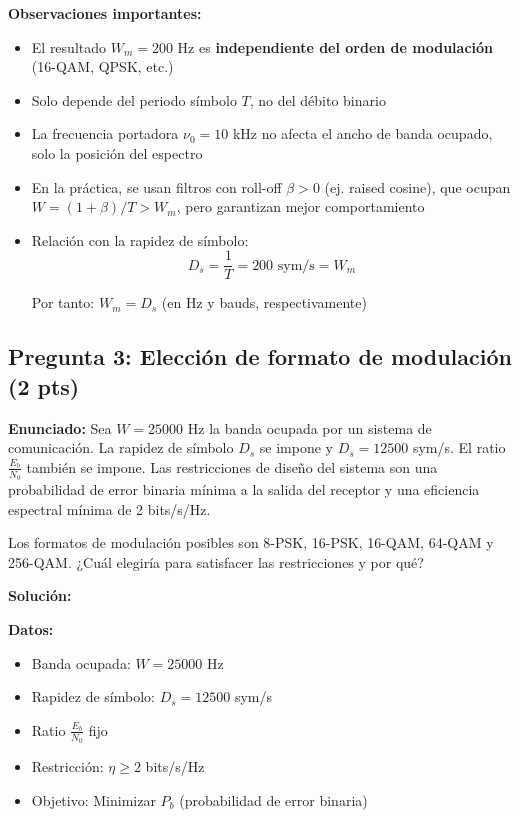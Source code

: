\documentclass[11pt,a4paper]{article}
\begin{document}
\textbf{Observaciones importantes:}

\begin{itemize}
    \item El resultado $W_m = 200$ Hz es \textbf{independiente del orden de modulaci\'on} (16-QAM, QPSK, etc.)
    
    \item Solo depende del periodo s\'imbolo $T$, no del d\'ebito binario
    
    \item La frecuencia portadora $\nu_0 = 10$ kHz no afecta el ancho de banda ocupado, solo la posici\'on del espectro
    
    \item En la pr\'actica, se usan filtros con roll-off $\beta > 0$ (ej. raised cosine), que ocupan $W = (1+\beta)/T > W_m$, pero garantizan mejor comportamiento
    
    \item Relaci\'on con la rapidez de s\'imbolo:
    \[
    D_s = \frac{1}{T} = 200 \text{ sym/s} = W_m
    \]
    
    Por tanto: $W_m = D_s$ (en Hz y bauds, respectivamente)
\end{itemize}



\subsection*{Pregunta 3: Elecci\'on de formato de modulaci\'on (2 pts)}

\textbf{Enunciado:} Sea $W = 25000$ Hz la banda ocupada por un sistema de comunicaci\'on. La rapidez de s\'imbolo $D_s$ se impone y $D_s = 12500$ sym/s. El ratio $\frac{E_b}{N_0}$ tambi\'en se impone. Las restricciones de dise\~no del sistema son una probabilidad de error binaria m\'inima a la salida del receptor y una eficiencia espectral m\'inima de 2 bits/s/Hz.

Los formatos de modulaci\'on posibles son 8-PSK, 16-PSK, 16-QAM, 64-QAM y 256-QAM. ¿Cu\'al elegir\'ia para satisfacer las restricciones y por qu\'e?

\vspace{0.3cm}
\textbf{Soluci\'on:}

\textbf{Datos:}
\begin{itemize}
    \item Banda ocupada: $W = 25000$ Hz
    \item Rapidez de s\'imbolo: $D_s = 12500$ sym/s
    \item Ratio $\frac{E_b}{N_0}$ fijo
    \item Restricci\'on: $\eta \geq 2$ bits/s/Hz
    \item Objetivo: Minimizar $P_b$ (probabilidad de error binaria)
\end{itemize}
\end{document}
